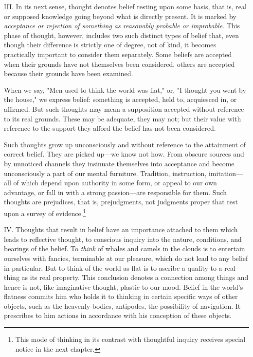 \documentclass[showtrims,ustradepaper]{memoir}
\begin{document}

III. In its next sense, thought denotes belief resting upon some basis,
that is, real or supposed knowledge going beyond what is directly
present. It is marked by \emph{acceptance or rejection of something as
reasonably probable or improbable}. This phase of thought, however,
includes two such distinct types of belief that, even though their
difference is strictly one of degree, not of kind, it becomes
practically important to consider them separately. Some beliefs are
accepted when their grounds have not themselves been considered, others
are accepted because their grounds have been examined.

When we say, "Men used to think the world was flat," or, "I thought you
went by the house," we express belief: something is accepted, held to,
acquiesced in, or affirmed. But such thoughts may mean a supposition
accepted without reference to its real grounds. These may be adequate,
they may not; but their value with reference to the support they afford
the belief has not been considered.

Such thoughts grow up unconsciously and without reference to the
attainment of correct belief. They are picked up---we know not how. From
obscure sources and by unnoticed channels they insinuate themselves into
acceptance and become unconsciously a part of our mental furniture.
Tradition, instruction, imitation---all of which depend upon authority
in some form, or appeal to our own advantage, or fall in with a strong
passion---are responsible for them. Such thoughts are prejudices, that
is, prejudgments, not judgments proper that rest upon a survey of
evidence.\footnote{This mode of thinking in its contrast with thoughtful inquiry receives
special notice in the next chapter.}


IV. Thoughts that result in belief have an importance attached to them
which leads to reflective thought, to conscious inquiry into the nature,
conditions, and bearings of the belief. To \emph{think} of whales and
camels in the clouds is to entertain ourselves with fancies, terminable
at our pleasure, which do not lead to any belief in particular. But to
think of the world as flat is to ascribe a quality to a real thing as
its real property. This conclusion denotes a connection among things and
hence is not, like imaginative thought, plastic to our mood. Belief in
the world's flatness commits him who holds it to thinking in certain
specific ways of other objects, such as the heavenly bodies, antipodes,
the possibility of navigation. It prescribes to him actions in
accordance with his conception of these objects.
\end{document}
